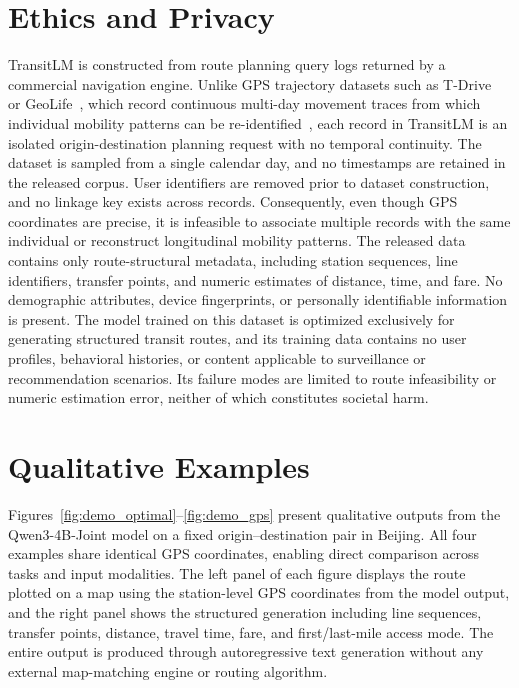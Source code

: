\documentclass{article}
\begin{document}
\section{Ethics and Privacy}
\label{app:ethics}

TransitLM is constructed from route planning query logs returned by a commercial navigation engine. Unlike GPS trajectory datasets such as T-Drive~\cite{yuan2010tdrive} or GeoLife~\cite{zheng2010geolife}, which record continuous multi-day movement traces from which individual mobility patterns can be re-identified~\cite{de2013unique}, each record in TransitLM is an isolated origin-destination planning request with no temporal continuity. The dataset is sampled from a single calendar day, and no timestamps are retained in the released corpus. User identifiers are removed prior to dataset construction, and no linkage key exists across records. Consequently, even though GPS coordinates are precise, it is infeasible to associate multiple records with the same individual or reconstruct longitudinal mobility patterns. The released data contains only route-structural metadata, including station sequences, line identifiers, transfer points, and numeric estimates of distance, time, and fare. No demographic attributes, device fingerprints, or personally identifiable information is present. The model trained on this dataset is optimized exclusively for generating structured transit routes, and its training data contains no user profiles, behavioral histories, or content applicable to surveillance or recommendation scenarios. Its failure modes are limited to route infeasibility or numeric estimation error, neither of which constitutes societal harm.

\section{Qualitative Examples}
\label{app:case_study}

Figures~\ref{fig:demo_optimal}--\ref{fig:demo_gps} present qualitative outputs from the Qwen3-4B-Joint model on a fixed origin--destination pair in Beijing. All four examples share identical GPS coordinates, enabling direct comparison across tasks and input modalities. The left panel of each figure displays the route plotted on a map using the station-level GPS coordinates from the model output, and the right panel shows the structured generation including line sequences, transfer points, distance, travel time, fare, and first/last-mile access mode. The entire output is produced through autoregressive text generation without any external map-matching engine or routing algorithm.
\end{document}
